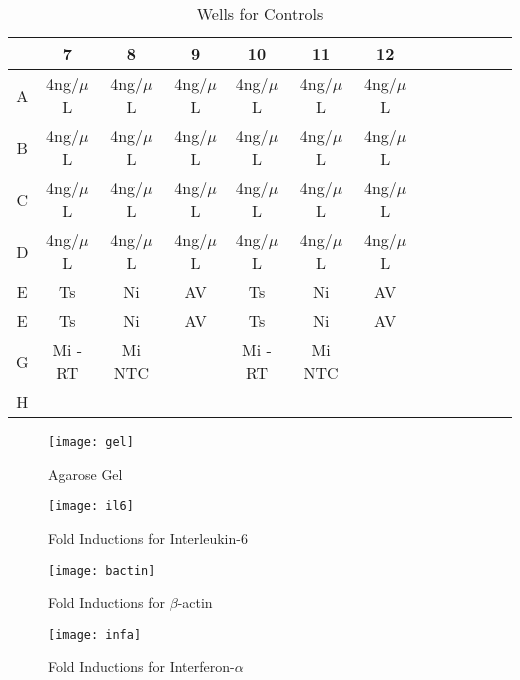 \documentclass[journal, a4paper]{IEEEtran}
\begin{document}
  \begin{table}[!hbt]
    \begin{center}
    \caption{Wells for Controls}
    \label{tab:simParameters}
    \begin{tabular}{|c|c|c|c|c|c|c|c|c|c|c|c|c|}
      \hline
      & 7 & 8 & 9 & 10 & 11 & 12 \\
      \hline
      A & 4ng/$\mu$L & 4ng/$\mu$L & 4ng/$\mu$L & 4ng/$\mu$L & 4ng/$\mu$L & 4ng/$\mu$L\\
      \hline
      B & 4ng/$\mu$L & 4ng/$\mu$L & 4ng/$\mu$L & 4ng/$\mu$L & 4ng/$\mu$L & 4ng/$\mu$L\\
      \hline
      C & 4ng/$\mu$L & 4ng/$\mu$L & 4ng/$\mu$L & 4ng/$\mu$L & 4ng/$\mu$L & 4ng/$\mu$L\\
      \hline
      D & 4ng/$\mu$L & 4ng/$\mu$L & 4ng/$\mu$L & 4ng/$\mu$L & 4ng/$\mu$L & 4ng/$\mu$L\\
      \hline
      E & Ts & Ni & AV & Ts & Ni & AV\\
      \hline
      E & Ts & Ni & AV & Ts & Ni & AV\\
      \hline
      G & Mi -RT & Mi NTC & & Mi -RT & Mi NTC & \\
      \hline
      H & & & & & &\\
      \hline
    \end{tabular}
    \end{center}
  \end{table}

  \begin{figure}[t]
    \centering
    \texttt{[image: gel]}
    \caption{Agarose Gel}
    \label{fig:mesh1}
  \end{figure}

  \begin{figure}[t]
    \centering
    \texttt{[image: il6]}
    \caption{Fold Inductions for Interleukin-6}
    \label{fig:mesh1}
  \end{figure}

  \begin{figure}[t]
    \centering
    \texttt{[image: bactin]}
    \caption{Fold Inductions for $\beta$-actin}
    \label{fig:mesh1}
  \end{figure}

  \begin{figure}[t]
    \centering
    \texttt{[image: infa]}
    \caption{Fold Inductions for Interferon-$\alpha$}
    \label{fig:mesh1}
  \end{figure}
\end{document}
